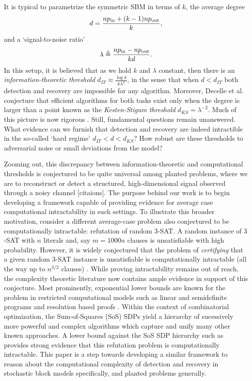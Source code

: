 It is typical to parametrize the symmetric SBM in terms of $k$, the average degree
$$
	d = \frac{np_{\textup{in}} + (k-1)np_{\textup{out}}}{k},
$$
and a `signal-to-noise ratio'
$$
	\lambda \triangleq \frac{np_{\textup{in}} - np_{\textup{out}}}{kd}.
$$
In this setup, it is believed that as we hold $k$ and $\lambda$ constant, then there is an \emph{information-theoretic threshold} $d_{IT} \approx \tfrac{\log k}{k\lambda^2}$, in the sense that when $d<d_{IT}$ both detection and recovery are impossible for any algorithm. Moreover, Decelle et al. conjecture that efficient algorithms for both tasks exist only when the degree is larger than a point known as the \emph{Kesten-Stigum threshold} $d_{KS} = \lambda^{-2}$. Much of this picture is now rigorous \cite{mossel2018proof, massoulie2014community,bordenave2015non,abbe2016exact}. Still, fundamental questions remain unanswered. What evidence can we furnish that detection and recovery are indeed intractible in the so-called `hard regime' $d_{IT} < d < d_{KS}$? How robust are these thresholds to adversarial noise or small deviations from the model?

Zooming out, this discrepancy between information-theoretic and computational thresholds is conjectured to be quite universal among planted problems, where we are to reconstruct or detect a structured, high-dimensional signal observed through a noisy channel [citaions]. The purpose behind our work is to begin developing a framework capable of providing evidence for average case computational intractability in such settings. To illustrate this broader motivation, consider a different average-case problem also conjectured to be computationally intractable: refutation of random $3$-SAT. A random instance of $3$-SAT with $n$ literals and, say $m = 1000 n$ clauses is unsatisfiable with high probability. However, it is widely conjectured that the problem of \emph{certifying} that a given random $3$-SAT instance is unsatisfiable is computationally intractable (all the way up to $n^{3/2}$ clauses) \cite{feigerandom3sat}. While proving intractability remains out of reach, the complexity theoretic literature now contains ample evidence in support of this conjecture. Most prominently, exponential lower bounds are known for the problem in restricted computational models such as linear and semidefinite programs \cite{grigoriev2001linear} and resolution based proofs \cite{ben2001short}. Within the context of combinatorial optimization, the Sum-of-Squares (SoS) SDPs yield a hierarchy of sucessively more powerful and complex algorithms which capture and unify many other known approaches. A lower bound against the SoS SDP hierarchy such as \cite{grigoriev2001linear} provides strong evidence that this refutation problem is computationally intractable. This paper is a step towards developing a similar framework to reason about the computational complexity of detection and recovery in stochastic block models specifically, and planted problems generally. 

